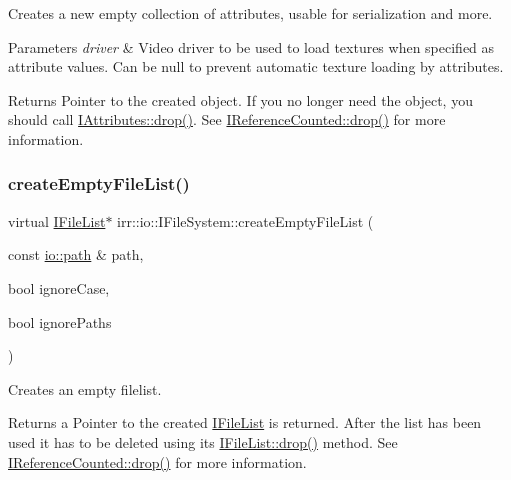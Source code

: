 Creates a new empty collection of attributes, usable for serialization and more. 


\begin{DoxyParams}{Parameters}
{\em driver} & Video driver to be used to load textures when specified as attribute values. Can be null to prevent automatic texture loading by attributes. \\
\hline
\end{DoxyParams}
\begin{DoxyReturn}{Returns}
Pointer to the created object. If you no longer need the object, you should call \hyperlink{classirr_1_1IReferenceCounted_a03856a09355b89d178090c4a5f738543}{I\+Attributes\+::drop()}. See \hyperlink{classirr_1_1IReferenceCounted_a03856a09355b89d178090c4a5f738543}{I\+Reference\+Counted\+::drop()} for more information. 
\end{DoxyReturn}
\mbox{\label{classirr_1_1io_1_1IFileSystem_a4f8a69f557f2b7022f6cd7346c3e85d2}} 
\subsubsection{\texorpdfstring{create\+Empty\+File\+List()}{createEmptyFileList()}}
{\footnotesize\ttfamily virtual \hyperlink{classirr_1_1io_1_1IFileList}{I\+File\+List}$\ast$ irr\+::io\+::\+I\+File\+System\+::create\+Empty\+File\+List (\begin{DoxyParamCaption}\item[{const \hyperlink{namespaceirr_1_1io_ab1bdc45edb3f94d8319c02bc0f840ee1}{io\+::path} \&}]{path,  }\item[{bool}]{ignore\+Case,  }\item[{bool}]{ignore\+Paths }\end{DoxyParamCaption})\hspace{0.3cm}{\ttfamily [pure virtual]}}



Creates an empty filelist. 

\begin{DoxyReturn}{Returns}
a Pointer to the created \hyperlink{classirr_1_1io_1_1IFileList}{I\+File\+List} is returned. After the list has been used it has to be deleted using its \hyperlink{classirr_1_1IReferenceCounted_a03856a09355b89d178090c4a5f738543}{I\+File\+List\+::drop()} method. See \hyperlink{classirr_1_1IReferenceCounted_a03856a09355b89d178090c4a5f738543}{I\+Reference\+Counted\+::drop()} for more information. 
\end{DoxyReturn}
\mbox{\label{classirr_1_1io_1_1IFileSystem_ad5820e7664377c12015ea7a6c801f7f8}} 
